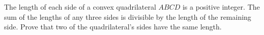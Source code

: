The length of each side of a convex quadrilateral $ABCD$ is a positive integer. The sum of the lengths of any three sides is divisible by the length of the remaining side. Prove that two of the quadrilateral's sides have the same length.
